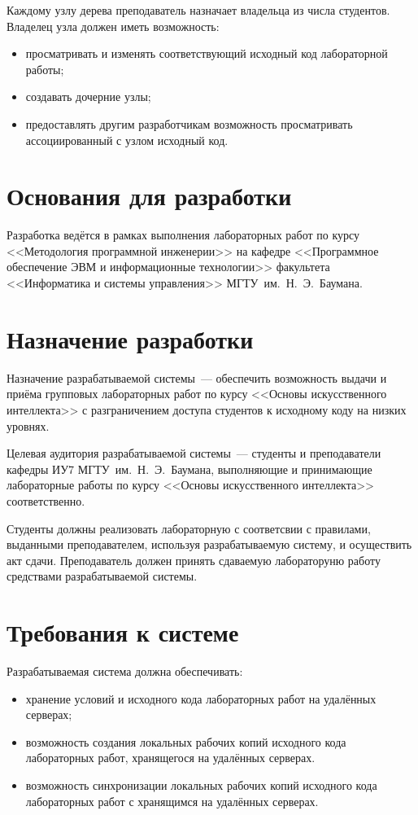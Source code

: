 \documentclass{bmstu}
\begin{document}
  \FloatBarrier

  Каждому узлу дерева преподаватель назначает владельца из числа
  студентов.
  Владелец узла должен иметь возможность:
  \begin{itemize}[label=---]
    \item просматривать и изменять соответствующий исходный код
      лабораторной работы;
    \item создавать дочерние узлы;
    \item предоставлять другим разработчикам возможность просматривать
      ассоциированный с узлом исходный код.
  \end{itemize}

  \section{Основания для разработки}

  Разработка ведётся в рамках выполнения лабораторных работ по курсу
  <<Методология программной инженерии>> на кафедре <<Программное
  обеспечение ЭВМ и информационные технологии>> факультета
  <<Информатика и системы управления>> МГТУ~им.~Н.~Э.~Баумана.

  \section{Назначение разработки}

  Назначение разрабатываемой системы~--- обеспечить возможность выдачи и приёма
  групповых лабораторных работ по курсу <<Основы
  искусственного интеллекта>> с разграничением доступа студентов к
  исходному коду на низких уровнях.

  Целевая аудитория разрабатываемой системы~--- студенты и
  преподаватели кафедры ИУ7 МГТУ~им.~Н.~Э.~Баумана, выполняющие и
  принимающие лабораторные работы по курсу <<Основы искусственного
  интеллекта>> соответственно.

  Студенты должны реализовать лабораторную с соответсвии с правилами,
  выданными преподавателем, используя разрабатываемую систему, и
  осуществить акт сдачи. Преподаватель должен принять сдаваемую лабораторуню
  работу средствами разрабатываемой системы. 

  \section{Требования к системе}

  Разрабатываемая система должна обеспечивать:
  \begin{itemize}[label=---]
    \item хранение условий и исходного кода лабораторных работ на
      удалённых серверах;
    \item возможность создания локальных рабочих копий исходного кода
      лабораторных работ, хранящегося на удалённых серверах.
    \item возможность синхронизации локальных рабочих копий исходного
      кода лабораторных работ с хранящимся на удалённых серверах.
  \end{itemize}
\end{document}
